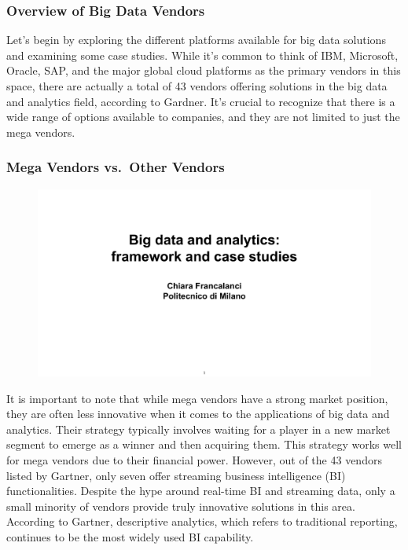 \subsubsection{Overview of Big Data Vendors}

Let's begin by exploring the different platforms available for big data
solutions and examining some case studies. While it's common to think of
IBM, Microsoft, Oracle, SAP, and the major global cloud platforms as the
primary vendors in this space, there are actually a total of 43 vendors
offering solutions in the big data and analytics field, according to
Gardner. It's crucial to recognize that there is a wide range of options
available to companies, and they are not limited to just the mega
vendors.

\subsubsection{Mega Vendors vs.~Other Vendors}


\begin{figure}[!h]
    \centering
    \includegraphics[page=57, trim = 0cm 2.5cm 0cm 4.5cm, clip, width=\textwidth]{images/06 - BIG_DATA.pdf}
\end{figure}

It is important to note that while mega vendors have a strong market
position, they are often less innovative when it comes to the
applications of big data and analytics. Their strategy typically
involves waiting for a player in a new market segment to emerge as a
winner and then acquiring them. This strategy works well for mega
vendors due to their financial power. However, out of the 43 vendors
listed by Gartner, only seven offer streaming business intelligence (BI)
functionalities. Despite the hype around real-time BI and streaming
data, only a small minority of vendors provide truly innovative
solutions in this area. According to Gartner, descriptive analytics,
which refers to traditional reporting, continues to be the most widely
used BI capability.

